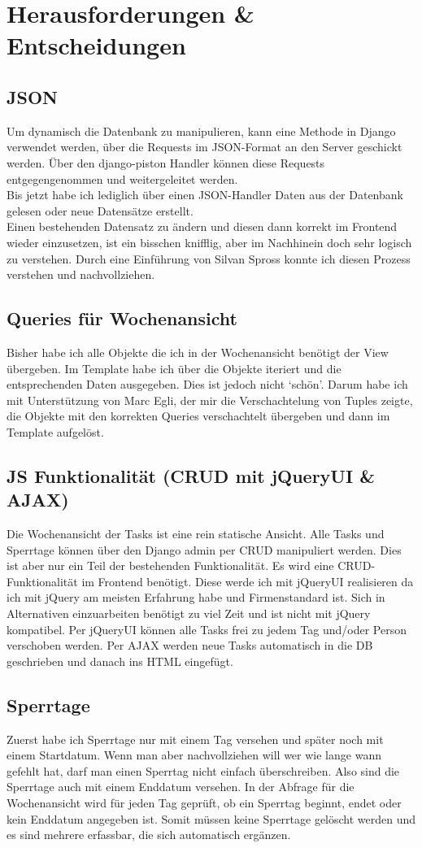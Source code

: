 \section{Herausforderungen \& Entscheidungen}
\subsection{JSON}
Um dynamisch die Datenbank zu manipulieren, kann eine Methode in Django verwendet werden, über die Requests im JSON-Format an den Server geschickt werden. 
Über den django-piston Handler können diese Requests entgegengenommen und weitergeleitet werden.\\
Bis jetzt habe ich lediglich über einen JSON-Handler Daten aus der Datenbank gelesen oder neue Datensätze erstellt.\\
Einen bestehenden Datensatz zu ändern und diesen dann korrekt im Frontend wieder einzusetzen, ist ein bisschen knifflig, aber im Nachhinein doch sehr logisch zu verstehen.
Durch eine Einführung von Silvan Spross konnte ich diesen Prozess verstehen und nachvollziehen.
\subsection{Queries für Wochenansicht}
Bisher habe ich alle Objekte die ich in der Wochenansicht benötigt der View übergeben.
Im Template habe ich über die Objekte iteriert und die entsprechenden Daten ausgegeben. Dies ist jedoch nicht `schön'. 
Darum habe ich mit Unterstützung von Marc Egli, der mir die Verschachtelung von Tuples zeigte, die Objekte mit den korrekten Queries verschachtelt übergeben und dann im Template aufgelöst.
\subsection{JS Funktionalität (CRUD mit jQueryUI \& AJAX) }
Die Wochenansicht der Tasks ist eine rein statische Ansicht.
Alle Tasks und Sperrtage können über den Django admin per CRUD manipuliert werden. Dies ist aber nur ein Teil der bestehenden Funktionalität.
Es wird eine CRUD-Funktionalität im Frontend benötigt. Diese werde ich mit jQueryUI realisieren da ich mit jQuery am meisten Erfahrung habe und Firmenstandard ist.
Sich in Alternativen einzuarbeiten benötigt zu viel Zeit und ist nicht mit jQuery kompatibel.
Per jQueryUI können alle Tasks frei zu jedem Tag und/oder Person verschoben werden.
Per AJAX werden neue Tasks automatisch in die DB geschrieben und danach ins HTML eingefügt.
\subsection{Sperrtage}
Zuerst habe ich Sperrtage nur mit einem Tag versehen und später noch mit einem Startdatum.
Wenn man aber nachvollziehen will wer wie lange wann gefehlt hat, darf man einen Sperrtag nicht einfach überschreiben.
Also sind die Sperrtage auch mit einem Enddatum versehen. In der Abfrage für die Wochenansicht wird für jeden Tag geprüft,
ob ein Sperrtag beginnt, endet oder kein Enddatum angegeben ist.
Somit müssen keine Sperrtage gelöscht werden und es sind mehrere erfassbar, die sich automatisch ergänzen.
